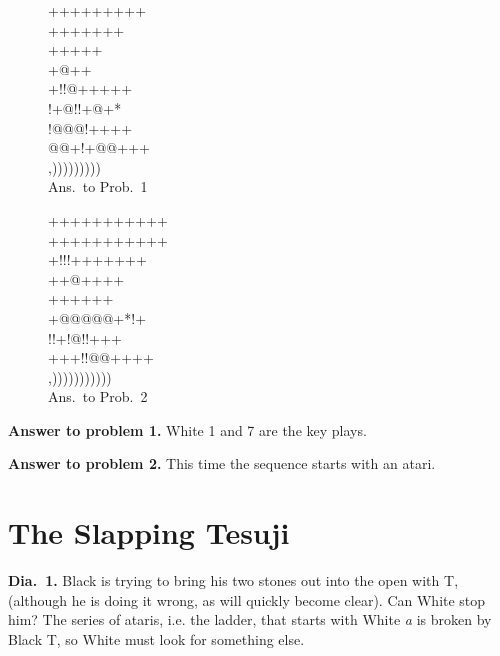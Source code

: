 \documentclass[mcrownvopaper,10pt,twopage,onecolumn,final]{memoir}
\begin{document}
\begin{figure}[ht]
    \begin{minipage}[c]{0.5\linewidth}
        \centering    
        {\gnos%
        +++++++++\\
        +++++++\\
        +++++\\
        +@++\\
        +!!@+++++\\
        !+@!!+@+*\\
        !@@@!++++\\
        @@+!+@@+++\\
        ,)))))))))\\
        }
        Ans.\ to Prob.\ 1
    \end{minipage}%
    \begin{minipage}[c]{0.5\linewidth}
        \centering    
        {\gnos%
        +++++++++++\\
        +++++++++++\\
        +!!!+++++++\\
        ++@{\gnosb{}}++++\\
        +++{\gnosw{}}{\gnosb{}}+++\\
        +@@@@@{\gnosw{}}+*!+\\
        !!+!@!!{\gnosb{}}+++\\
        +++!!@@++++\\
        ,)))))))))))\\
        }
        Ans.\ to Prob.\ 2
    \end{minipage}
\end{figure}
\noindent
\textbf{Answer to problem 1.} White 1 and 7 are the key plays.

\noindent
\textbf{Answer to problem 2.} This time the sequence starts with an atari.

\section{The Slapping Tesuji}
\noindent
\textbf{Dia.\ 1.} Black is trying to bring his two stones out into the open with {\gnos T},
(although he is doing it wrong, as will quickly become clear). Can
White stop him? The series of ataris, i.e. the ladder, that starts with
White \textit{a} is broken by Black {\gnos T}, so White must look for something else.
\end{document}
